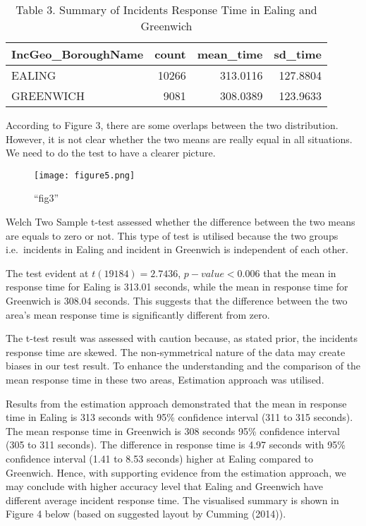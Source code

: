 \documentclass[
]{article}
\begin{document}
\begin{table}

\caption{\label{tab:unnamed-chunk-8}Table 3. Summary of Incidents Response Time in Ealing and Greenwich}
\centering
\begin{tabular}[t]{l|r|r|r}
\hline
IncGeo\_BoroughName & count & mean\_time & sd\_time\\
\hline
EALING & 10266 & 313.0116 & 127.8804\\
\hline
GREENWICH & 9081 & 308.0389 & 123.9633\\
\hline
\end{tabular}
\end{table}

According to Figure 3, there are some overlaps between the two
distribution. However, it is not clear whether the two means are really
equal in all situations. We need to do the test to have a clearer
picture.

\begin{figure}
\centering
\texttt{[image: figure5.png]}
\caption{``fig3''}
\end{figure}

Welch Two Sample t-test assessed whether the difference between the two
means are equals to zero or not. This type of test is utilised because
the two groups i.e.~incidents in Ealing and incident in Greenwich is
independent of each other.

The test evident at \(t(19184)=2.7436\), \(p-value < 0.006\) that the
mean in response time for Ealing is 313.01 seconds, while the mean in
response time for Greenwich is 308.04 seconds. This suggests that the
difference between the two area's mean response time is significantly
different from zero.

The t-test result was assessed with caution because, as stated prior,
the incidents response time are skewed. The non-symmetrical nature of
the data may create biases in our test result. To enhance the
understanding and the comparison of the mean response time in these two
areas, Estimation approach was utilised.

Results from the estimation approach demonstrated that the mean in
response time in Ealing is 313 seconds with 95\% confidence interval
(311 to 315 seconds). The mean response time in Greenwich is 308 seconds
95\% confidence interval (305 to 311 seconds). The difference in
response time is 4.97 seconds with 95\% confidence interval (1.41 to
8.53 seconds) higher at Ealing compared to Greenwich. Hence, with
supporting evidence from the estimation approach, we may conclude with
higher accuracy level that Ealing and Greenwich have different average
incident response time. The visualised summary is shown in Figure 4
below (based on suggested layout by Cumming (2014)).
\end{document}
